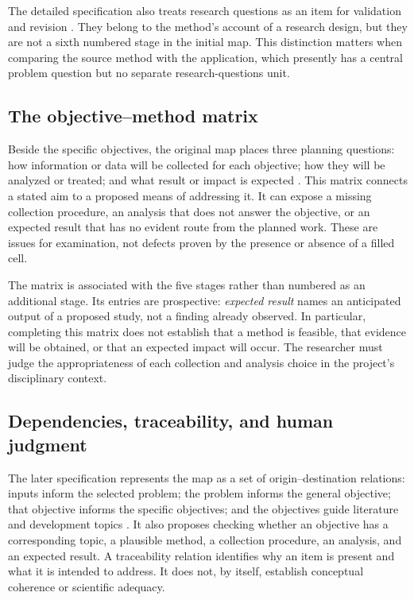 The detailed specification also treats research questions as an item for validation and revision \cite{franca2026detail}. They belong to the method's account of a research design, but they are not a sixth numbered stage in the initial map. This distinction matters when comparing the source method with the application, which presently has a central problem question but no separate research-questions unit.

\subsection{The objective--method matrix}

Beside the specific objectives, the original map places three planning questions: how information or data will be collected for each objective; how they will be analyzed or treated; and what result or impact is expected \cite{franca2026map}. This matrix connects a stated aim to a proposed means of addressing it. It can expose a missing collection procedure, an analysis that does not answer the objective, or an expected result that has no evident route from the planned work. These are issues for examination, not defects proven by the presence or absence of a filled cell.

The matrix is associated with the five stages rather than numbered as an additional stage. Its entries are prospective: \emph{expected result} names an anticipated output of a proposed study, not a finding already observed. In particular, completing this matrix does not establish that a method is feasible, that evidence will be obtained, or that an expected impact will occur. The researcher must judge the appropriateness of each collection and analysis choice in the project's disciplinary context.

\subsection{Dependencies, traceability, and human judgment}

The later specification represents the map as a set of origin--destination relations: inputs inform the selected problem; the problem informs the general objective; that objective informs the specific objectives; and the objectives guide literature and development topics \cite{franca2026detail}. It also proposes checking whether an objective has a corresponding topic, a plausible method, a collection procedure, an analysis, and an expected result. A traceability relation identifies why an item is present and what it is intended to address. It does not, by itself, establish conceptual coherence or scientific adequacy.

